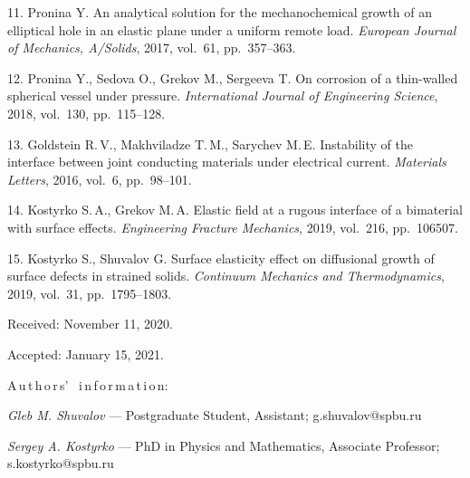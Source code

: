 {11. Pronina Y. 
An analytical solution for the mechanochemical growth of an elliptical hole in an elastic plane under a uniform remote load. 
{\it European Journal of Mechanics, A/Solids},  2017, vol.~61, pp.~357--363.

12. Pronina Y., Sedova O., Grekov M., Sergeeva T. 
On corrosion of a thin-walled spherical vessel under pressure. 
{\it International Journal of Engineering Science},  2018, vol.~130, pp.~115--128.

13. Goldstein R.\,V., Makhviladze T.\,M., Sarychev M.\,E. 
Instability of the interface between joint conducting materials under electrical current. 
{\it Materials Letters}, 2016, vol.~6, pp.~98--101.

14. Kostyrko S.\,A., Grekov M.\,A. 
Elastic field at a rugous interface of a bimaterial with surface effects. 
{\it Engineering Fracture Mechanics},  2019, vol.~216, pp.~106507.

15. Kostyrko S., Shuvalov G. 
Surface elasticity effect on diffusional growth of surface defects in strained solids. 
{\it Continuum Mechanics and Thermodynamics},   2019, vol.~31, pp.~1795--1803.


\vskip 1.5mm

%


Received:  November 11, 2020.

Accepted: January 15, 2021.

\vskip 4.5mm%
A\,u\,t\,h\,o\,r\,s' \ i\,n\,f\,o\,r\,m\,a\,t\,i\,o\,n:

\vskip 2mm \textit{Gleb M. Shuvalov} ---  Postgraduate Student, Assistant; g.shuvalov@spbu.ru 

\vskip 2mm \textit{Sergey A. Kostyrko} --- PhD in Physics and Mathematics, Associate Professor; s.kostyrko@spbu.ru 


}
